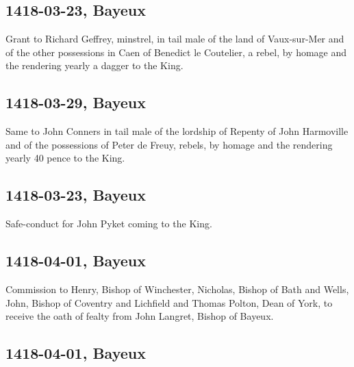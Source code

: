 \documentclass[a4paper,12pt,twoside]{book}
\begin{document}
                
                \subsection{1418-03-23, Bayeux}
                
                
                  Grant to Richard Geffrey, minstrel, in tail male of the land of Vaux-sur-Mer and of the other possessions in Caen of Benedict le Coutelier, a rebel, by homage and the rendering yearly a dagger to the King.
               
                
                \subsection{1418-03-29, Bayeux}
                
                
                  Same to John Conners in tail male of the lordship of Repenty of John Harmoville and of the possessions of Peter de Freuy, rebels, by homage and the rendering yearly 40 pence to the King.
               
                
                \subsection{1418-03-23, Bayeux}
                
                
                  Safe-conduct for John Pyket coming to the King.
               
                
                \subsection{1418-04-01, Bayeux}
                
                
                  Commission to Henry, Bishop of Winchester, Nicholas, Bishop of Bath and Wells, John, Bishop of Coventry and Lichfield and Thomas Polton, Dean of York, to receive the oath of fealty from John Langret, Bishop of Bayeux.
               
                
                \subsection{1418-04-01, Bayeux}
                
\end{document}
